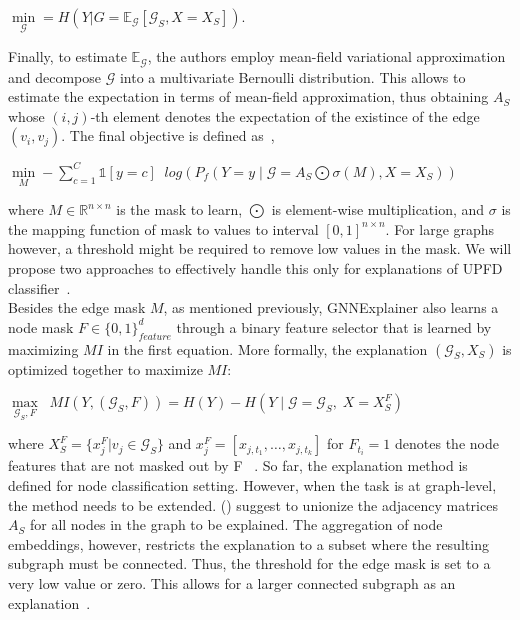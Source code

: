 \begin{center}
    $\min\limits_{\mathcal{G}} = H(Y | G = \mathbb{E}_{\mathcal{G}} [\mathcal{G}_S, X = X_S])$.
\end{center}
Finally, to estimate $\mathbb{E}_{\mathcal{G}}$, the authors employ mean-field variational approximation and decompose $\mathcal{G}$ into a multivariate Bernoulli distribution. This allows to estimate the expectation in terms of mean-field approximation, thus obtaining $A_S$ whose $(i, j)$-th element denotes the expectation of the existince of the edge $(v_i, v_j)$. The final objective is defined as~\parencite{GNNExplainer_Ying},
\begin{center}
    $\min\limits_M - \sum\limits_{c=1}^C \mathbb{1}[y = c] \;\;log(P_f (Y=y \;|\; \mathcal{G} = A_S \bigodot \sigma(M), X = X_S))$
\end{center}
where $M \in \mathbb{R}^{n \times n}$ is the mask to learn, $\bigodot$ is element-wise multiplication, and $\sigma$ is
the mapping function of mask to values to interval $[0, 1]^{n \times n}$. For large graphs however, a threshold might be required to remove low values in the mask. We will propose two approaches to effectively
handle this only for explanations of UPFD classifier~\parencite{GNNExplainer_Ying}.\\
Besides the edge mask $M$, as mentioned previously, GNNExplainer also learns a node mask $F \in \{0, 1\}^d_{feature}$ through a binary feature selector that is learned by maximizing $MI$ in the first equation. More formally, the explanation $(\mathcal{G}_S, X_S)$ is optimized together to maximize $MI$:
\begin{center}
    $\max\limits_{\mathcal{G}_S, F} \;\; MI (Y, (\mathcal{G}_S, F)) = H(Y) - H(Y \;|\; \mathcal{G} = \mathcal{G}_S,\; X = X_S^F)$
\end{center}
where $X_S^F = \{x_j^F|v_j \in \mathcal{G}_S\}$ and $x_j^F = [x_{j, t_1}, \dots, x_{j, t_k}]$ for
$F_{t_i} = 1$ denotes the node features that are not masked out by F~\parencite{GNNExplainer_Ying} . So far, the
explanation method is defined for node classification setting. However, when the task is at graph-level, the method needs
to be extended. \citeauthor{GNNExplainer_Ying} (\citeyear{GNNExplainer_Ying}) suggest to unionize the adjacency matrices $A_S$ for all nodes in the graph to be explained. The aggregation of node embeddings, however, restricts the explanation to a subset where the resulting subgraph must be connected. Thus, the threshold for the edge mask is set to a very low value or zero. This allows for a larger connected subgraph as an explanation~\parencite{GNNExplainer_Ying}.\\


